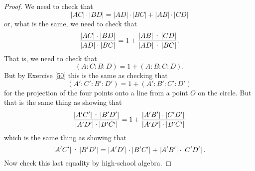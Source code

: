 \documentclass{ximera}
\begin{document}
\begin{proof}
We need to check that%
\[
\left\vert AC\right\vert \cdot\left\vert BD\right\vert
=\left\vert AD\right\vert \cdot\left\vert BC\right\vert
+\left\vert AB\right\vert \cdot\left\vert CD\right\vert
\]
or, what is the same, we need to check that%
\[
\frac{\left\vert AC\right\vert \cdot\left\vert
BD\right\vert }{\left\vert AD\right\vert \cdot\left\vert
BC\right\vert }=1+\frac{\left\vert AB\right\vert \text{\textperiodcentered
}\left\vert CD\right\vert }{\left\vert AD\right\vert \text{\textperiodcentered
}\left\vert BC\right\vert }.
\]
That is, we need to check that
\[
\left(  A:C:B:D\right)  =1+\left(  A:B:C:D\right)  .
\]
But by Exercise \ref{50} this is the same as checking that%
\[
\left(  A':C':B':D'\right)  =1+\left(
A':B':C':D'\right)
\]
for the projection of the four points onto a line from a point $O$ on the
circle. But that is the same thing as showing that
\[
\frac{\left\vert A'C'\right\vert \text{\textperiodcentered
}\left\vert B'D'\right\vert }{\left\vert A'D^{\prime
}\right\vert \cdot\left\vert B'C^{\prime
}\right\vert }=1+\frac{\left\vert A'B'\right\vert
\cdot\left\vert C'D'\right\vert
}{\left\vert A'D'\right\vert \cdot \left\vert B'C'\right\vert }%
\]
which is the same thing as showing that%
\[
\left\vert A'C'\right\vert \text{\textperiodcentered
}\left\vert B'D'\right\vert =\left\vert A'D^{\prime
}\right\vert \cdot\left\vert B'C^{\prime
}\right\vert +\left\vert A'B'\right\vert
\cdot\left\vert C'D'\right\vert .
\]
Now check this last equality by high-school algebra.
\end{proof}
\end{document}
